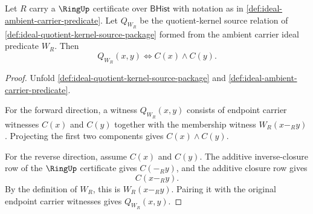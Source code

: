\begin{theorem}
\label{thm:ideal-ambient-quotient-kernel-carrier-exactness}
Let $R$ carry a $\RingUp$ certificate over $\mathsf{BHist}$ with notation as in
\autoref{def:ideal-ambient-carrier-predicate}. Let $Q_{W_R}$ be the
quotient-kernel source relation of
\autoref{def:ideal-quotient-kernel-source-package} formed from the ambient
carrier ideal predicate $W_R$. Then
$$
Q_{W_R}(x,y)\Longleftrightarrow C(x)\land C(y).
$$
\end{theorem}
\begin{proof}
Unfold \autoref{def:ideal-quotient-kernel-source-package} and
\autoref{def:ideal-ambient-carrier-predicate}.

For the forward direction, a witness $Q_{W_R}(x,y)$ consists of endpoint
carrier witnesses $C(x)$ and $C(y)$ together with the membership witness
$W_R(x-_R y)$. Projecting the first two components gives $C(x)\land C(y)$.

For the reverse direction, assume $C(x)$ and $C(y)$. The additive
inverse-closure row of the $\RingUp$ certificate gives $C(-_R y)$, and the
additive closure row gives
$$
C(x-_R y).
$$
By the definition of $W_R$, this is $W_R(x-_R y)$. Pairing it with the original
endpoint carrier witnesses gives $Q_{W_R}(x,y)$.
\end{proof}

